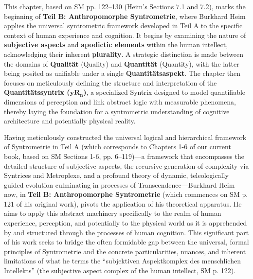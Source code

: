 \documentclass[12pt]{article}
\newcommand{\q}[1]{\enquote{#1}}
\newcommand{\quantitaetssyntrix}{\bm{yR_n}}
\begin{document}
This chapter, based on SM pp. 122–130 (Heim's Sections 7.1 and 7.2), marks the beginning of \textbf{Teil B: Anthropomorphe Syntrometrie}, where Burkhard Heim applies the universal syntrometric framework developed in Teil A to the specific context of human experience and cognition. It begins by examining the nature of \textbf{subjective aspects} and \textbf{apodictic elements} within the human intellect, acknowledging their inherent \textbf{plurality}. A strategic distinction is made between the domains of \textbf{Qualität} (Quality) and \textbf{Quantität} (Quantity), with the latter being posited as unifiable under a single \textbf{Quantitätsaspekt}. The chapter then focuses on meticulously defining the structure and interpretation of the \textbf{Quantitätssyntrix (\(\quantitaetssyntrix\))}, a specialized Syntrix designed to model quantifiable dimensions of perception and link abstract logic with measurable phenomena, thereby laying the foundation for a syntrometric understanding of cognitive architecture and potentially physical reality.

Having meticulously constructed the universal logical and hierarchical framework of Syntrometrie in Teil A (which corresponds to Chapters 1-6 of our current book, based on SM Sections 1-6, pp. 6–119)—a framework that encompasses the detailed structure of subjective aspects, the recursive generation of complexity via Syntrices and Metroplexe, and a profound theory of dynamic, teleologically guided evolution culminating in processes of Transcendence—Burkhard Heim now, in \textbf{Teil B: Anthropomorphe Syntrometrie} (which commences on SM p. 121 of his original work), pivots the application of his theoretical apparatus. He aims to apply this abstract machinery specifically to the realm of human experience, perception, and potentially to the physical world as it is apprehended by and structured through the processes of human cognition. This significant part of his work seeks to bridge the often formidable gap between the universal, formal principles of Syntrometrie and the concrete particularities, nuances, and inherent limitations of what he terms the \q{subjektiven Aspektkomplex des menschlichen Intellekts} (the subjective aspect complex of the human intellect, SM p. 122).
\end{document}
